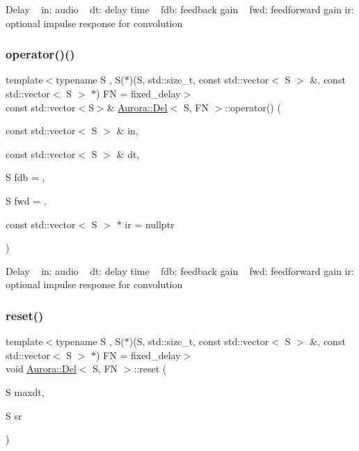 Delay ~\newline
in\+: audio ~\newline
dt\+: delay time ~\newline
fdb\+: feedback gain ~\newline
fwd\+: feedforward gain ir\+: optional impulse response for convolution \mbox{\label{class_aurora_1_1_del_aa15df6bc9f86c73725a0fbc91b42ebc2}} 
\subsubsection{\texorpdfstring{operator()()}{operator()()}\hspace{0.1cm}{\footnotesize\ttfamily [2/2]}}
{\footnotesize\ttfamily template$<$typename S , S($\ast$)(\+S, std\+::size\+\_\+t, const std\+::vector$<$ S $>$ \&, const std\+::vector$<$ S $>$ $\ast$) FN = fixed\+\_\+delay$>$ \\
const std\+::vector$<$S$>$\& \hyperlink{class_aurora_1_1_del}{Aurora\+::\+Del}$<$ S, FN $>$\+::operator() (\begin{DoxyParamCaption}\item[{const std\+::vector$<$ S $>$ \&}]{in,  }\item[{const std\+::vector$<$ S $>$ \&}]{dt,  }\item[{S}]{fdb = {},  }\item[{S}]{fwd = {},  }\item[{const std\+::vector$<$ S $>$ $\ast$}]{ir = {\ttfamily nullptr} }\end{DoxyParamCaption})\hspace{0.3cm}{\ttfamily [inline]}}

Delay ~\newline
in\+: audio ~\newline
dt\+: delay time ~\newline
fdb\+: feedback gain ~\newline
fwd\+: feedforward gain ir\+: optional impulse response for convolution \mbox{\label{class_aurora_1_1_del_adcb695eca560d6ead399a8bbafef9025}} 
\subsubsection{\texorpdfstring{reset()}{reset()}}
{\footnotesize\ttfamily template$<$typename S , S($\ast$)(\+S, std\+::size\+\_\+t, const std\+::vector$<$ S $>$ \&, const std\+::vector$<$ S $>$ $\ast$) FN = fixed\+\_\+delay$>$ \\
void \hyperlink{class_aurora_1_1_del}{Aurora\+::\+Del}$<$ S, FN $>$\+::reset (\begin{DoxyParamCaption}\item[{S}]{maxdt,  }\item[{S}]{sr }\end{DoxyParamCaption})\hspace{0.3cm}{\ttfamily [inline]}}

